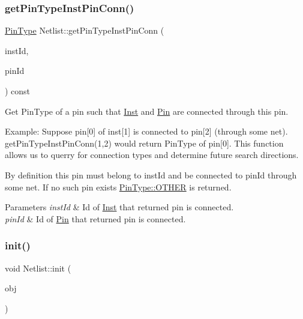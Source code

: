 \subsubsection{\texorpdfstring{get\+Pin\+Type\+Inst\+Pin\+Conn()}{getPinTypeInstPinConn()}}
{\footnotesize\ttfamily \hyperlink{type_8h_afaab50027002ecbb6c8ac27e727d1bb4}{Pin\+Type} Netlist\+::get\+Pin\+Type\+Inst\+Pin\+Conn (\begin{DoxyParamCaption}\item[{\hyperlink{type_8h_a581e8093e28e7362f2b6937296190676}{Index\+Type}}]{inst\+Id,  }\item[{\hyperlink{type_8h_a581e8093e28e7362f2b6937296190676}{Index\+Type}}]{pin\+Id }\end{DoxyParamCaption}) const}



Get Pin\+Type of a pin such that \hyperlink{classInst}{Inst} and \hyperlink{classPin}{Pin} are connected through this pin. 

Example\+: Suppose pin\mbox{[}0\mbox{]} of inst\mbox{[}1\mbox{]} is connected to pin\mbox{[}2\mbox{]} (through some net). get\+Pin\+Type\+Inst\+Pin\+Conn(1,2) would return Pin\+Type of pin\mbox{[}0\mbox{]}. This function allows us to querry for connection types and determine future search directions.

By definition this pin must belong to inst\+Id and be connected to pin\+Id through some net. If no such pin exists \hyperlink{type_8h_afaab50027002ecbb6c8ac27e727d1bb4a03570470bad94692ce93e32700d2e1cb}{Pin\+Type\+::\+O\+T\+H\+ER} is returned.


\begin{DoxyParams}{Parameters}
{\em inst\+Id} & Id of \hyperlink{classInst}{Inst} that returned pin is connected. \\
\hline
{\em pin\+Id} & Id of \hyperlink{classPin}{Pin} that returned pin is connected. \\
\hline
\end{DoxyParams}
\mbox{\label{classNetlist_ab61cbc31bee838b90f29c52aaae1e52a}} 
\subsubsection{\texorpdfstring{init()}{init()}}
{\footnotesize\ttfamily void Netlist\+::init (\begin{DoxyParamCaption}\item[{\hyperlink{structNetlist_1_1InitDataObj}{Init\+Data\+Obj} \&}]{obj }\end{DoxyParamCaption})}



